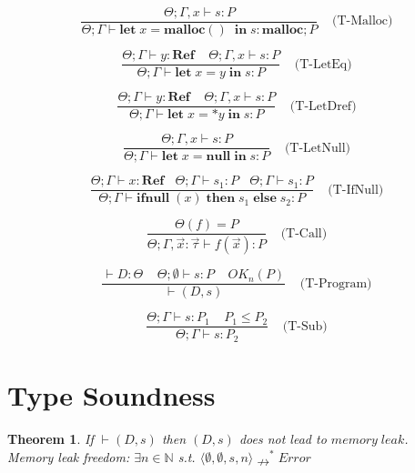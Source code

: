 \documentclass[english]{jssst_ppl} %
\newcommand\LET{\mathbf{let}\;}
\newcommand\IN{\mathbf{in}\;}
\newcommand\Rtab{\; \; \; \;}
\newcommand\IFNULL{\mathbf{ifnull}\;}
\newcommand\THEN{\mathbf{then}\;}
\newcommand\ELSE{\mathbf{else}\;}
\newcommand\MALLOC{\mathbf{malloc()}\;}
\newcommand\Malloc{\mathbf{malloc}}
\newtheorem{theorem}{Theorem}[section]
\begin{document}
$$
     \frac{\Theta ; \Gamma,x \vdash s : P}
           {\Theta ; \Gamma \vdash \LET x = \MALLOC \; \IN s  : \Malloc;P}
           \Rtab \mbox{(T-Malloc)}
$$

$$
     \frac{\Theta ; \Gamma \vdash y : \mathbf{Ref}  \Rtab \Theta ; \Gamma , x  \vdash s : P}
           {\Theta ; \Gamma \vdash \LET x = y \; \IN s : P}
     \Rtab \mbox{(T-LetEq)}
$$

$$
     \frac{\Theta ; \Gamma \vdash y : \mathbf{Ref}  \Rtab \Theta ; \Gamma , x  \vdash s : P}
           {\Theta ; \Gamma \vdash \LET x = *y \; \IN s : P}
     \Rtab \mbox{(T-LetDref)}
$$

$$
     \frac{\Theta ; \Gamma, x \vdash s : P}
           {\Theta ; \Gamma \vdash \LET x = \mathbf{null} \; \IN s : P}
     \Rtab \mbox{(T-LetNull)}
$$

$$
     \frac{\Theta ; \Gamma \vdash x : \mathbf{Ref}   \ \ \ \  \Theta ; \Gamma \vdash s_{1} : P \ \ \ \ \Theta ; \Gamma \vdash s_{1} : P}
           {\Theta ; \Gamma \vdash \IFNULL(x) \; \THEN s_{1}\; \ELSE s_{2} : P}
     \Rtab \mbox{(T-IfNull)}
$$

$$ \frac{ \Theta(f) = P}
{\Theta; \Gamma, \vec{x} : \vec{\tau} \vdash f(\vec{x}) : P}
\Rtab \mbox{(T-Call)} $$

$$\frac{\vdash D : \Theta \;\;\;\; \Theta; \emptyset\vdash s : P \Rtab OK_{n}(P)}
{\vdash (D, s)}
\Rtab \mbox{(T-Program)} $$

$$
     \frac{\Theta ; \Gamma \vdash s : P_{1} \Rtab P_{1} \le P_{2}}
            {\Theta ; \Gamma \vdash s : P_{2}}
     \Rtab \mbox{(T-Sub)}
$$

\section{Type Soundness}
\begin{theorem}\label{thm1}
If $\vdash (D, s)$ then $(D, s)$ does not lead to $memory\;leak$.\\
Memory leak freedom: $\exists n \in \mathbb{N}$ s.t.
$\langle \emptyset, \emptyset, s, n \rangle \nrightarrow^{*}Error$
\end{theorem}
\noindent
\end{document}
